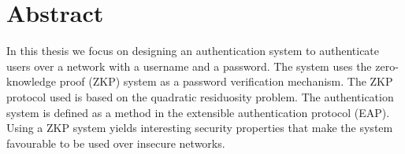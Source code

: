 \section*{Abstract}
In this thesis we focus on designing an authentication system to authenticate users over a network with a username and a password.
The system uses the zero-knowledge proof (ZKP) system as a password verification mechanism.
The ZKP protocol used is based on the quadratic residuosity problem.
The authentication system is defined as a method in the extensible authentication protocol (EAP).
Using a ZKP system yields interesting security properties that make the system favourable to be used over insecure networks.
\newpage